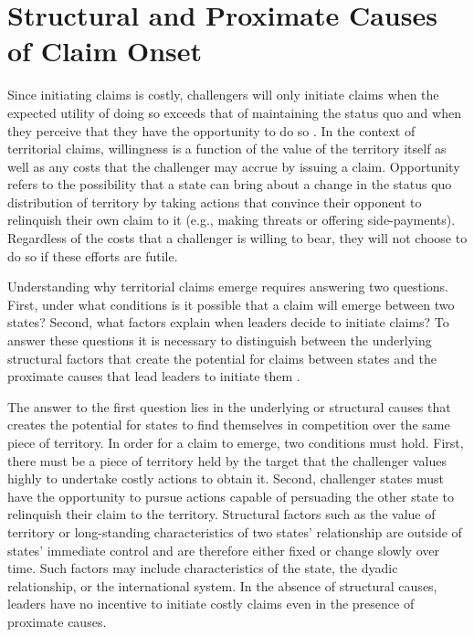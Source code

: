 \section{Structural and Proximate Causes of Claim Onset}




Since initiating claims is costly, challengers will only initiate claims when the expected utility of doing so exceeds that of maintaining the status quo and when they perceive that they have the opportunity to do so \citep{most1989}. In the context of territorial claims, willingness is a function of the value of the territory itself as well as any costs that the challenger may accrue by issuing a claim. Opportunity refers to the possibility that a state can bring about a change in the status quo distribution of territory by taking actions that convince their opponent to relinquish their own claim to it (e.g., making threats or offering side-payments). Regardless of the costs that a challenger is willing to bear, they will not choose to do so if these efforts are futile.


Understanding why territorial claims emerge requires answering two questions. First, under what conditions is it possible that a claim will emerge between two states? Second, what factors explain when leaders decide to initiate claims? To answer these questions it is necessary to distinguish between the underlying structural factors that create the potential for claims between states and the proximate causes that lead leaders to initiate them \citep[see, e.g.,][]{mansbach1981, stinnett2001, vasquez2009}.


The answer to the first question lies in the underlying or structural causes that creates the potential for states to find themselves in competition over the same piece of territory. In order for a claim to emerge, two conditions must hold. First, there must be a piece of territory held by the target that the challenger values highly to undertake costly actions to obtain it. Second, challenger states must have the opportunity to pursue actions capable of persuading the other state to relinquish their claim to the territory. Structural factors such as the value of territory or long-standing characteristics of two states’ relationship are outside of states’ immediate control and are therefore either fixed or change slowly over time. Such factors may include characteristics of the state, the dyadic relationship, or the international system. In the absence of structural causes, leaders have no incentive to initiate costly claims even in the presence of proximate causes. 

